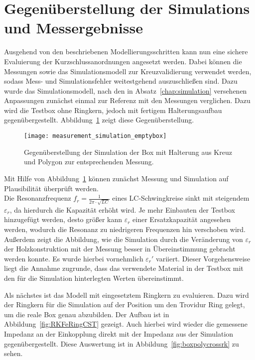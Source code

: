 \section{Gegen\"uberstellung der Simulations und Messergebnisse}\label{sec:gegenueberst}
Ausgehend von den beschriebenen Modellierungsschritten kann nun eine sichere Evaluierung der Kurzschlussanordnungen angesetzt werden. Dabei k\"onnen die Messungen sowie das Simulationsmodell zur Kreuzvalidierung verwendet werden, sodass Mess- und Simulationsfehler weitestgehend auszuschlie\ss{}en sind. Dazu wurde das Simulationsmodell, nach den in Absatz~\ref{chap:simulation} versehenen Anpassungen zun\"achst einmal zur Referenz mit den Messungen verglichen. Dazu wird die Testbox ohne Ringkern, jedoch mit fertigem Halterungsaufbau gegen\"ubergestellt. Abbildung~\ref{fig:boxpolycross} zeigt diese Gegen\"uberstellung.

\begin{figure}[htb]
	\centering
	\texttt{[image: measurement\_simulation\_emptybox]}
	\caption{Gegen\"uberstellung der Simulation der Box mit Halterung aus Kreuz und Polygon zur entsprechenden Messung.}
	\label{fig:boxpolycross}
\end{figure}

Mit Hilfe von Abbildung~\ref{fig:boxpolycross} können zunächst Messung und Simulation auf Plausibilität überprüft werden.\\
Die Resonanzfrequenz $f_r = \frac{1}{2\pi \cdot \sqrt{LC}}$ eines LC-Schwingkreise sinkt mit steigendem $\varepsilon_r$, da hierdurch die Kapazität erhöht wird. Je mehr Einbauten der Testbox hinzugefügt werden, desto größer kann $\varepsilon_r$ einer Ersatzkapazit\"at angesehen werden, wodurch die Resonanz zu niedrigeren Frequenzen hin verschoben wird.\\
Außerdem zeigt die Abbildung, wie die Simulation durch die Veränderung von $\varepsilon_r$ der Holzkonstruktion mit der Messung besser in Übereinstimmung gebracht werden konnte. Es wurde hierbei vornehmlich $\varepsilon_r'$ variiert. Dieser Vorgehensweise liegt die Annahme zugrunde, dass das verwendete Material in der Testbox mit den für die Simulation hinterlegten Werten übereinstimmt.
\par
Als n\"achstes ist das Modell mit eingesetztem Ringkern zu evaluieren. Dazu wird der Ringkern f\"ur die Simulation auf der Position um den Trovidur Ring gelegt, um die reale Box genau abzubilden. Der Aufbau ist in Abbildung~\ref{fig:RKFeRingCST} gezeigt. Auch hierbei wird wieder die gemessene Impedanz an der Einkopplung direkt mit der Impedanz aus der Simulation gegen\"ubergestellt. Diese Auswertung ist in Abbildung~\ref{fig:boxpolycrossrk} zu sehen.



